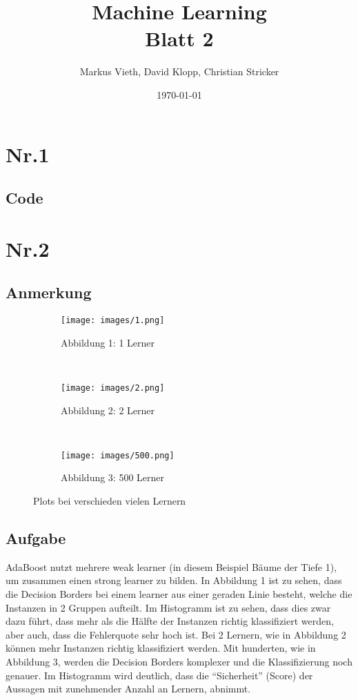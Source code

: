 \documentclass[a4paper,11pt,twoside]{article}
\title{Machine Learning\\ Blatt 2}
\author{Markus Vieth, David Klopp, Christian Stricker}
\date{\today}
\begin{document}
\newcommand{\cor}[1]{\textcolor{red}{\textit{#1}}}
\maketitle
\cleardoublepage
\pagestyle{myheadings}

\section*{Nr.1}
\subsection*{Code}


\newpage

\section*{Nr.2}
\subsection*{Anmerkung}
\begin{figure*}[t!]
	\centering
	\begin{subfigure}[t]{0.33\textwidth}
		\texttt{[image: images/1.png]}
		\caption{Abbildung 1: 1 Lerner}
	\end{subfigure}%
	~
	\begin{subfigure}[t]{0.33\textwidth}
		\texttt{[image: images/2.png]}
		\caption{Abbildung 2: 2 Lerner}
	\end{subfigure}%
	~
	\begin{subfigure}[t]{0.33\textwidth}
		\texttt{[image: images/500.png]}
		\caption{Abbildung 3: 500 Lerner}
	\end{subfigure}
	
	\caption{Plots bei verschieden vielen Lernern}
\end{figure*}

\subsection*{Aufgabe}
AdaBoost nutzt mehrere weak learner (in diesem Beispiel Bäume der Tiefe 1), um zusammen einen strong learner zu bilden. In Abbildung 1 ist zu sehen, dass die Decision Borders bei einem learner aus einer geraden Linie besteht, welche die Instanzen in 2 Gruppen aufteilt. Im Histogramm ist zu sehen, dass dies zwar dazu führt, dass mehr als die Hälfte der Instanzen richtig klassifiziert werden, aber auch, dass die Fehlerquote sehr hoch ist. Bei 2 Lernern, wie in Abbildung 2 können mehr Instanzen richtig klassifiziert werden. Mit hunderten, wie in Abbildung 3, werden die Decision Borders komplexer und die Klassifizierung noch genauer. Im Histogramm wird deutlich, dass die "`Sicherheit"' (Score) der Aussagen mit zunehmender Anzahl an Lernern, abnimmt.
\end{document}
